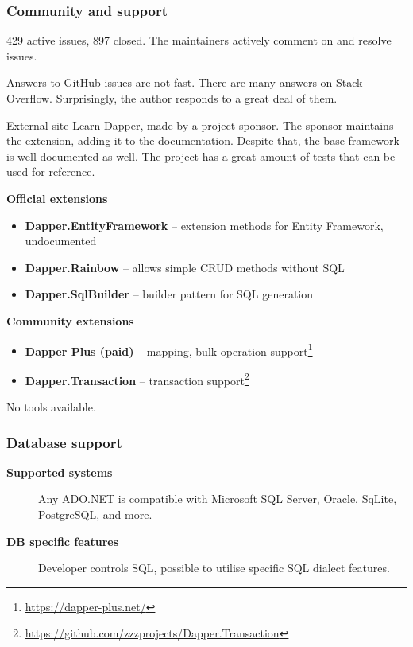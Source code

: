 \subsubsection*{Community and support}
\begin{description}
    \item[\textbf{Project upkeep}] 429 active issues, 897 closed. The maintainers actively comment on and resolve issues.
    \item[\textbf{Support}] Answers to GitHub issues are not fast. There are many answers on Stack Overflow. Surprisingly, the author responds to a great deal of them.
    \item[\textbf{Documentation}] External site Learn Dapper, made by a project sponsor. The sponsor maintains the extension, adding it to the documentation. Despite that, the base framework is well documented as well. The project has a great amount of tests that can be used for reference. 
    \item\textbf{Official extensions}
    \begin{itemize}
      \item \textbf{Dapper.EntityFramework} – extension methods for Entity Framework, undocumented
      \item \textbf{Dapper.Rainbow} – allows simple CRUD methods without SQL
      \item \textbf{Dapper.SqlBuilder} – builder pattern for SQL generation
    \end{itemize}
    \item\textbf{Community extensions}
    \begin{itemize}
      \item \textbf{Dapper Plus (paid)} – mapping, bulk operation support\footnote{\url{https://dapper-plus.net/}}
      \item \textbf{Dapper.Transaction} – transaction support\footnote{\url{https://github.com/zzzprojects/Dapper.Transaction}}
    \end{itemize}
    \item[\textbf{Development tools}] No tools available.
\end{description}

\subsubsection*{Database support}
\begin{description}
    \item[\textbf{Supported systems}] Any ADO.NET is compatible with Microsoft SQL Server, Oracle, SqLite, PostgreSQL, and more.
    \item[\textbf{DB specific features}] Developer controls SQL, possible to utilise specific SQL dialect features.
\end{description}

